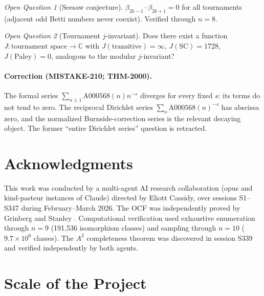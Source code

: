 \documentclass[11pt,a4paper]{article}
\theoremstyle{definition}
\theoremstyle{remark}
\newtheorem{openquestion}{Open Question}
\begin{document}
\begin{openquestion}[Seesaw conjecture]
$\beta_{2k-1} \cdot \beta_{2k+1} = 0$ for all tournaments (adjacent odd Betti numbers never coexist). Verified through $n = 8$.
\end{openquestion}

\begin{openquestion}[Tournament $j$-invariant]
Does there exist a function $J: \text{tournament space} \to \mathbb{C}$ with $J(\text{transitive}) = \infty$, $J(\text{SC}) = 1728$, $J(\text{Paley}) = 0$, analogous to the modular $j$-invariant?
\end{openquestion}

\paragraph{Correction (MISTAKE-210; THM-2000).}
The formal series $\sum_{n \geq 1}\mathrm{A000568}(n)n^{-s}$ diverges for
every fixed $s$: its terms do not tend to zero.  The reciprocal Dirichlet
series $\sum_n\mathrm{A000568}(n)^{-s}$ has abscissa zero, and the normalized
Burnside-correction series is the relevant decaying object.  The former
``entire Dirichlet series'' question is retracted.

\section*{Acknowledgments}

This work was conducted by a multi-agent AI research collaboration (opus and kind-pasteur instances of Claude) directed by Eliott Cassidy, over sessions S1--S347 during February--March 2026. The OCF was independently proved by Grinberg and Stanley \cite{grinberg2024}. Computational verification used exhaustive enumeration through $n = 9$ (191,536 isomorphism classes) and sampling through $n = 10$ ($9.7 \times 10^6$ classes). The $A^2$ completeness theorem was discovered in session S339 and verified independently by both agents.

\section{Scale of the Project}
\label{sec:scale}
\end{document}
